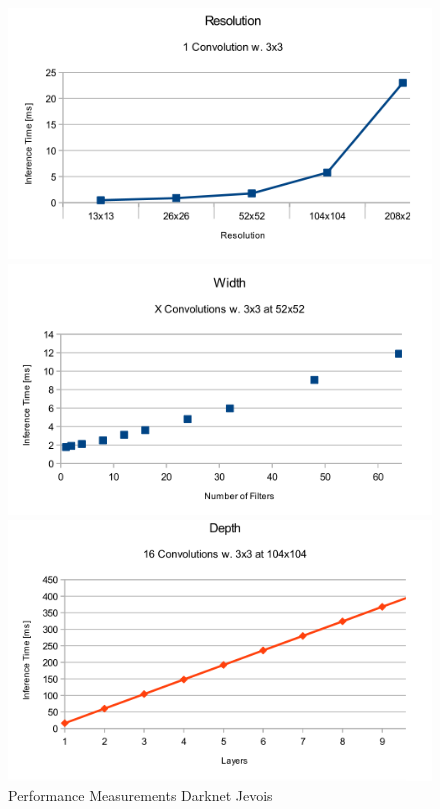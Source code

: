 \documentclass{article}
\begin{document}
\begin{figure}[h]
	\begin{minipage}{0.5\textwidth}
		\includegraphics[width=\textwidth]{resolution_jevois.png}
	\end{minipage}
	\begin{minipage}{0.5\textwidth}
		\includegraphics[width=\textwidth]{width_jevois.png}
\end{minipage}

	\begin{minipage}{0.5\textwidth}
		\includegraphics[width=\textwidth]{depth_jevois.png}
\end{minipage}
\label{fig:jevois}

\caption{Performance Measurements Darknet Jevois}
\end{figure}
\end{document}
